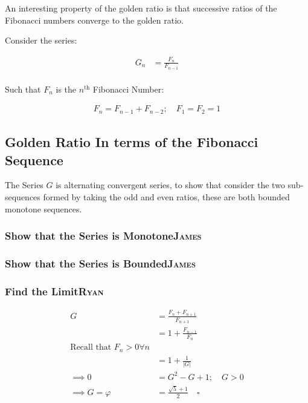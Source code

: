 \documentclass[a4paper,11pt,twoside]{article}
\begin{document}
An interesting property of the golden ratio is that successive ratios of the
Fibonacci numbers converge to the golden ratio.

Consider the series:

$$\begin{aligned}
G_n &= \frac{F_{n} }{F_{n - 1} } \\
\end{aligned}$$

Such that \(F_{n}\) is the \(n^{\mathrm{th}}\) Fibonacci Number:

$$\begin{aligned}
F_n = F_{n- 1} +  F_{n- 2} ; \quad F_1 = F_2 = 1
\end{aligned}$$

\subsection{Golden Ratio In terms of the Fibonacci Sequence}
\label{sec:orge3b07f5}
The Series \(G\) is alternating convergent series, to show that consider the two sub-sequences formed by taking the odd and even ratios, these are both bounded monotone sequences.
\subsubsection{Show that the Series is Monotone\hfill{}\textsc{James}}
\label{sec:orgce9adf4}
\subsubsection{Show that the Series is Bounded\hfill{}\textsc{James}}
\label{sec:org6783f20}
\subsubsection{Find the Limit\hfill{}\textsc{Ryan}}
\label{sec:org6a9d3a7}
$$\begin{aligned}
G &= \frac{F_{n} +  F_{n+  1} }{F_{n+  1} } \\
&= 1 +  \frac{F_{n- 1} }{F_n} \\
\text{Recall that $F_n > 0 \forall n$}\\
&=  1 +  \frac{1}{    \left\lvert G \right\rvert } \\
 \implies  0 &= G^2- G +  1; \quad G > 0  \\
  \implies  G = \varphi &=  \frac{\sqrt{5} + 1  }{2} \quad  \square
\end{aligned}$$
\end{document}
